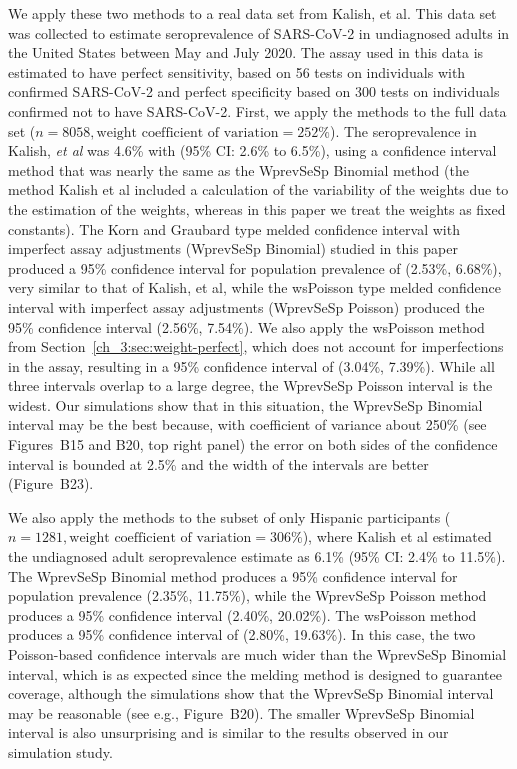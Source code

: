 We apply these two methods to a real data set from Kalish, et al.\cite{Kali:2021}
This data set was collected to estimate seroprevalence of SARS-CoV-2 in undiagnosed adults in the United States between May and July 2020.
The assay used in this data is estimated to have perfect sensitivity, based on 56 tests on individuals with confirmed SARS-CoV-2 and perfect specificity based on 300 tests on individuals confirmed not to have SARS-CoV-2.
First, we apply the methods to the full data set (\( n = 8058, \text{weight coefficient of variation} = 252\%\)).
The seroprevalence in Kalish, {\it et al } was 4.6\% with (95\% CI: 2.6\% to 6.5\%), using a confidence interval method that was nearly the same as the WprevSeSp Binomial method (the method Kalish et al included a calculation of the variability of the weights due to the estimation of the weights, whereas in this paper we treat the weights as fixed constants).
The Korn and Graubard type melded confidence interval with imperfect assay adjustments (WprevSeSp Binomial) studied in this paper produced a 95\% confidence interval for population prevalence of (2.53\%, 6.68\%), very similar to that of Kalish, et al, while the wsPoisson type melded confidence interval with imperfect assay adjustments (WprevSeSp Poisson) produced the 95\% confidence interval (2.56\%, 7.54\%).
We also apply the wsPoisson method from Section~\ref{ch_3:sec:weight-perfect}, which does not account for imperfections in the assay, resulting in a 95\% confidence interval of (3.04\%, 7.39\%).
While all three intervals overlap to a large degree, the WprevSeSp Poisson interval is the widest.
Our simulations show that in this situation, the WprevSeSp Binomial interval may be the best because, with coefficient of variance about 250\% (see Figures~B15 and B20, top right panel) the error on both sides of the confidence interval is bounded at 2.5\% and the width of the intervals are better (Figure~B23).


We also apply the methods to the subset of only Hispanic participants (\( n = 1281, \text{weight coefficient of variation} = 306\% \)), where Kalish et al estimated the undiagnosed adult seroprevalence estimate as 6.1\% (95\% CI: 2.4\% to 11.5\%).
The WprevSeSp Binomial method produces a 95\% confidence interval for population prevalence (2.35\%, 11.75\%), while the WprevSeSp Poisson method produces a 95\% confidence interval (2.40\%, 20.02\%).
The wsPoisson method produces a 95\% confidence interval of (2.80\%, 19.63\%).
In this case, the two Poisson-based confidence intervals are much wider than the WprevSeSp Binomial interval, which is as expected since the melding method is designed to guarantee coverage, although the simulations show that the WprevSeSp Binomial interval may be reasonable (see e.g., Figure~B20).
The smaller WprevSeSp Binomial interval is also unsurprising and is similar to the results observed in our simulation study.

